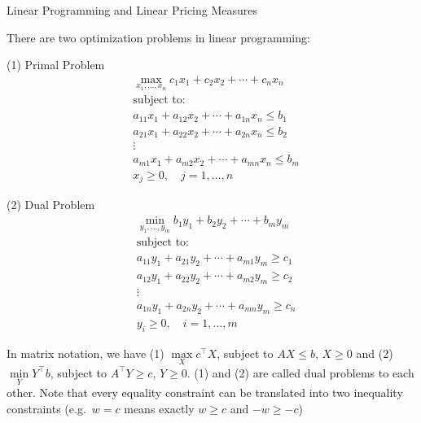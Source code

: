 \documentclass{beamer}
\begin{document}
\begin{frame}{Linear Programming and Linear Pricing Measures}

    {\footnotesize \footnotesize
     There are two optimization problems in linear programming:

    \begin{multicols}{2}
\noindent
(1) Primal Problem
\[
\begin{aligned}
&\max_{x_1,\ldots,x_n} c_1 x_1 + c_2 x_2 + \cdots + c_n x_n \\
&\text{subject to: } \\
&a_{11} x_1 + a_{12} x_2 + \cdots + a_{1n} x_n \leq b_1 \\
&a_{21} x_1 + a_{22} x_2 + \cdots + a_{2n} x_n \leq b_2 \\
&\vdots \\
&a_{m1} x_1 + a_{m2} x_2 + \cdots + a_{mn} x_n \leq b_m \\
&x_j \geq 0, \quad j = 1, \ldots, n
\end{aligned}
\]


\noindent
 \pause (2) Dual Problem
\[
\begin{aligned}
&\min_{y_1,\ldots,y_m} b_1 y_1 + b_2 y_2 + \cdots + b_m y_m \\
&\text{subject to: } \\
&a_{11} y_1 + a_{21} y_2 + \cdots + a_{m1} y_m \geq c_1 \\
&a_{12} y_1 + a_{22} y_2 + \cdots + a_{m2} y_m \geq c_2 \\
&\vdots \\
&a_{1n} y_1 + a_{2n} y_2 + \cdots + a_{mn} y_m \geq c_n \\
&y_i \geq 0, \quad i = 1, \ldots, m
\end{aligned}
\]
\end{multicols}
 \pause In matrix notation, we have (1) $\max\limits_X c^\top X$, subject to $AX \leq b$, $X \geq 0$ 
and (2) $\min\limits_Y Y^\top b$, subject to $A^\top Y \geq c$, $Y \geq 0$. (1) and (2) 
are called dual problems to each other. Note that every equality constraint can be translated into two 
inequality constraints (e.g.\ $w = c$ means exactly $w \geq c$ and $-w \geq -c$)

    }
\end{frame}
\end{document}
